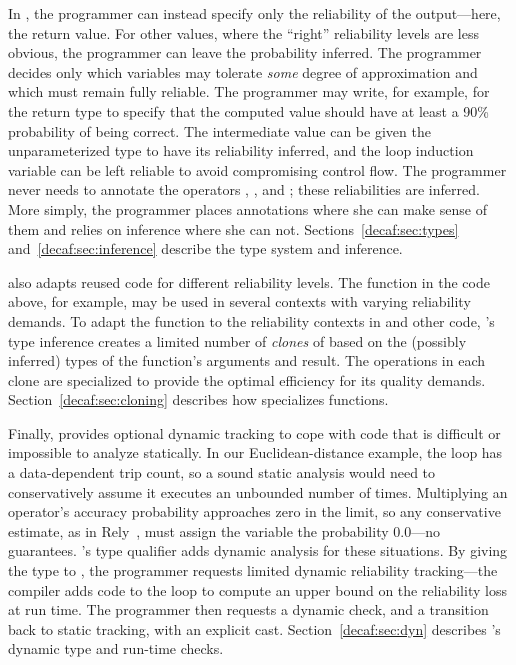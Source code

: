 In \lang, the programmer can instead specify only the reliability of the
output---here, the return value.
For other values, where the ``right'' reliability levels are less obvious, the
programmer can leave the probability inferred.
The programmer decides only which variables may tolerate \emph{some} degree of
approximation and which must remain fully reliable.
The programmer may write, for example,  for the
return type to specify that the computed value should have at least a 90\%
probability of being correct.
The intermediate value  can be given the
unparameterized type  to have its reliability inferred, and
the loop induction variable  can be left reliable to avoid compromising
control flow.
The programmer never needs to annotate the
operators \code{-}, \code{*}, and \code{+}; these reliabilities are inferred.
More simply, the programmer places annotations where she can make sense of
them and relies on inference where she can not.
Sections~\ref{decaf:sec:types} and~\ref{decaf:sec:inference} describe the type system and
inference.

\lang also adapts reused code for different reliability levels.
The  function in the code above, for example, may be used in
several contexts with varying reliability demands.
To adapt the  function to the reliability contexts in 
and other code,
\lang's type inference creates a limited number of \emph{clones} of
 based on the (possibly inferred) types of the function's arguments
and result.
The operations in each clone are specialized to provide the optimal efficiency
for its quality demands.
Section~\ref{decaf:sec:cloning} describes how \lang specializes
functions.

Finally, \lang provides optional dynamic tracking to cope with code that
is difficult or impossible to analyze statically.
In our Euclidean-distance example, the  loop has a data-dependent
trip count, so a sound static analysis would need to conservatively assume it
executes an unbounded number of times.
Multiplying an operator's accuracy probability approaches zero in the limit,
so any conservative estimate, as in Rely~\cite{rely},
must assign the  variable
the probability 0.0---no guarantees.
\lang's  type qualifier adds dynamic analysis for
these situations.
By giving the type  to , the programmer
requests limited dynamic reliability tracking---the
compiler adds code to the loop to compute an upper bound on the reliability
loss at run time.
The programmer then requests a dynamic check, and a transition back to static
tracking, with an explicit  cast.
Section~\ref{decaf:sec:dyn} describes \lang's dynamic type and run-time checks.

